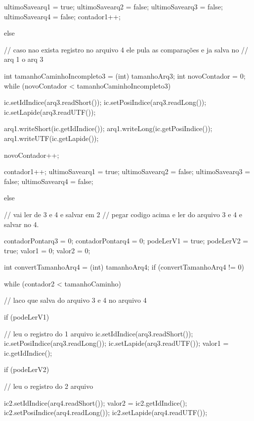 {{{{{{                  }
                }
                ultimoSavearq1 = true;
                ultimoSavearq2 = false;
                ultimoSavearq3 = false;
                ultimoSavearq4 = false;
                contador1++;

              } else {// caso nao exista registro no arquivo 4 ele pula as comparações e ja salva no
                      // arq 1 o arq 3

                int tamanhoCaminhoIncompleto3 = (int) tamanhoArq3;
                int novoContador = 0;
                while (novoContador < tamanhoCaminhoIncompleto3) {

                  ic.setIdIndice(arq3.readShort());
                  ic.setPosiIndice(arq3.readLong());
                  ic.setLapide(arq3.readUTF());

                  arq1.writeShort(ic.getIdIndice());
                  arq1.writeLong(ic.getPosiIndice());
                  arq1.writeUTF(ic.getLapide());

                  novoContador++;
                }
                contador1++;
                ultimoSavearq1 = true;
                ultimoSavearq2 = false;
                ultimoSavearq3 = false;
                ultimoSavearq4 = false;
              }
            } else {// vai ler de 3 e 4 e salvar em 2
              // pegar codigo acima e ler do arquivo 3 e 4 e salvar no 4.

              contadorPontarq3 = 0;
              contadorPontarq4 = 0;
              podeLerV1 = true;
              podeLerV2 = true;
              valor1 = 0;
              valor2 = 0;

              int convertTamanhoArq4 = (int) tamanhoArq4;
              if (convertTamanhoArq4 != 0) {

                while (contador2 < tamanhoCaminho) {// laco que salva do arquivo 3 e 4 no arquivo 4

                  if (podeLerV1) {
                    // leu o registro do 1 arquivo
                    ic.setIdIndice(arq3.readShort());
                    ic.setPosiIndice(arq3.readLong());
                    ic.setLapide(arq3.readUTF());
                    valor1 = ic.getIdIndice();

                  }

                  if (podeLerV2) {
                    // leu o registro do 2 arquivo

                    ic2.setIdIndice(arq4.readShort());
                    valor2 = ic2.getIdIndice();
                    ic2.setPosiIndice(arq4.readLong());
                    ic2.setLapide(arq4.readUTF());

}}}}}}
